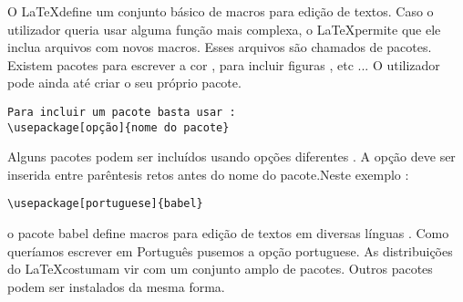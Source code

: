 O \LaTeX define um conjunto básico de macros para edição de textos. Caso o utilizador queria usar alguma função mais complexa, o \LaTeX permite que ele inclua arquivos com novos macros. Esses arquivos são chamados de pacotes. Existem pacotes para escrever a cor , para incluir figuras , etc ...
O utilizador pode ainda até criar o seu próprio pacote. 

\begin{verbatim}
Para incluir um pacote basta usar :
\usepackage[opção]{nome do pacote}
\end{verbatim}

Alguns pacotes podem ser incluídos usando opções diferentes . A opção deve ser inserida entre parêntesis retos antes do nome do pacote.Neste exemplo :

\begin{verbatim}
\usepackage[portuguese]{babel}
\end{verbatim}

o pacote babel define macros para edição de textos em diversas línguas . Como queríamos escrever em Português pusemos a opção portuguese. As distribuições do \LaTeX costumam vir com um conjunto amplo de pacotes. Outros pacotes podem ser instalados da mesma forma.